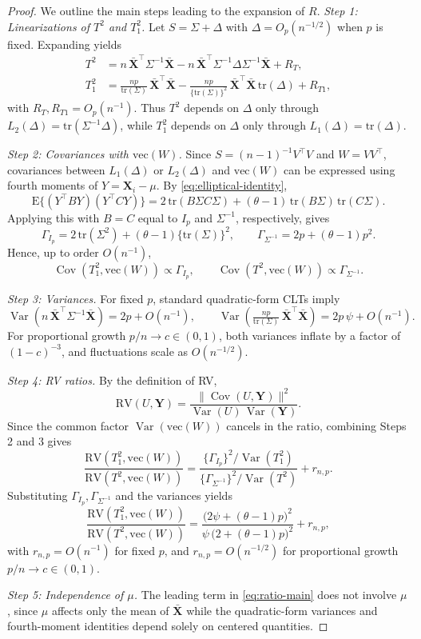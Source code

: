 \documentclass[10pt,a4paper]{amsart}
\DeclareMathOperator{\Cov}{Cov}
\DeclareMathOperator{\Var}{Var}
\begin{document}
\begin{proof} We outline the main steps leading to the expansion of $R$.
	\textit{Step 1: Linearizations of $T^2$ and $T_1^2$.}  
	Let $S=\Sigma+\Delta$ with $\Delta=O_p(n^{-1/2})$ when $p$ is fixed. Expanding yields
	\begin{align}
		T^2 &= n\,\bar{\mathbf{X}}^{\top}\Sigma^{-1}\bar{\mathbf{X}}
		- n\,\bar{\mathbf{X}}^{\top}\Sigma^{-1}\Delta\Sigma^{-1}\bar{\mathbf{X}} + R_{T}, \label{eq:T2-exp}\\
		T_1^2 &= \frac{n p}{\mathrm{tr}(\Sigma)}\,\bar{\mathbf{X}}^{\top}\bar{\mathbf{X}}
		- \frac{n p}{\{\mathrm{tr}(\Sigma)\}^{2}}\,\bar{\mathbf{X}}^{\top}\bar{\mathbf{X}}\,\mathrm{tr}(\Delta) + R_{T1}, \label{eq:T1-exp}
	\end{align}
	with $R_T,R_{T1}=O_p(n^{-1})$. Thus $T^2$ depends on $\Delta$ only through $L_2(\Delta)=\mathrm{tr}(\Sigma^{-1}\Delta)$, while $T_1^2$ depends on $\Delta$ only through $L_1(\Delta)=\mathrm{tr}(\Delta)$.
	
	\textit{Step 2: Covariances with $\mathrm{vec}(W)$.}  
	Since $S=(n-1)^{-1}V^\top V$ and $W=VV^\top$, covariances between $L_1(\Delta)$ or $L_2(\Delta)$ and $\mathrm{vec}(W)$ can be expressed using fourth moments of $Y=\mathbf{X}_i-\mu$. 
	By \eqref{eq:elliptical-identity},
	\[
	\mathrm{E}\{(Y^\top BY)(Y^\top CY)\}
	=2\,\mathrm{tr}(B\Sigma C\Sigma)+(\theta-1)\,\mathrm{tr}(B\Sigma)\,\mathrm{tr}(C\Sigma).
	\]
	Applying this with $B=C$ equal to $I_p$ and $\Sigma^{-1}$, respectively, gives
	\[
	\Gamma_{I_p} = 2\,\mathrm{tr}(\Sigma^2) + (\theta-1)\{\mathrm{tr}(\Sigma)\}^2, 
	\qquad
	\Gamma_{\Sigma^{-1}} = 2p+(\theta-1)p^2.
	\]
	Hence, up to order $O(n^{-1})$, 
	\[
	\Cov(T_1^2,\mathrm{vec}(W)) \propto \Gamma_{I_p}, 
	\qquad 
	\Cov(T^2,\mathrm{vec}(W)) \propto \Gamma_{\Sigma^{-1}}.
	\]
	
	\textit{Step 3: Variances.}  
	For fixed $p$, standard quadratic-form CLTs imply
	\[
	\Var\!\left(n\,\bar{\mathbf{X}}^{\top}\Sigma^{-1}\bar{\mathbf{X}}\right) = 2p+O(n^{-1}),
	\qquad
	\Var\!\left(\tfrac{n p}{\mathrm{tr}(\Sigma)}\,\bar{\mathbf{X}}^{\top}\bar{\mathbf{X}}\right) 
	= 2p\,\psi+O(n^{-1}).
	\]
	For proportional growth $p/n\to c\in(0,1)$, both variances inflate by a factor of $(1-c)^{-3}$, and fluctuations scale as $O(n^{-1/2})$.
	
	\textit{Step 4: RV ratios.}  
	By the definition of RV,
	\[
	\mathrm{RV}(U,\mathbf{Y})=\frac{\|\Cov(U,\mathbf{Y})\|^2}{\Var(U)\,\Var(\mathbf{Y})}.
	\]
	Since the common factor $\Var(\mathrm{vec}(W))$ cancels in the ratio, combining Steps 2 and 3 gives
	\[
	\frac{\mathrm{RV}(T_1^2,\mathrm{vec}(W))}{\mathrm{RV}(T^2,\mathrm{vec}(W))}
	=\frac{\{\Gamma_{I_p}\}^2/\Var(T_1^2)}{\{\Gamma_{\Sigma^{-1}}\}^2/\Var(T^2)}+r_{n,p}.
	\]
	Substituting $\Gamma_{I_p},\Gamma_{\Sigma^{-1}}$ and the variances yields
	\[
	\frac{\mathrm{RV}(T_1^2,\mathrm{vec}(W))}{\mathrm{RV}(T^2,\mathrm{vec}(W))}
	=\frac{\big(2\psi+(\theta-1)p\big)^2}{\psi\,\big(2+(\theta-1)p\big)^2}+r_{n,p},
	\]
	with $r_{n,p}=O(n^{-1})$ for fixed $p$, and $r_{n,p}=O(n^{-1/2})$ for proportional growth $p/n\to c\in(0,1)$.
	
	\textit{Step 5: Independence of $\mu$.}  
	The leading term in \eqref{eq:ratio-main} does not involve $\mu$, since $\mu$ affects only the mean of $\bar{\mathbf{X}}$ while the quadratic-form variances and fourth-moment identities depend solely on centered quantities.
	
\end{proof}
\end{document}
